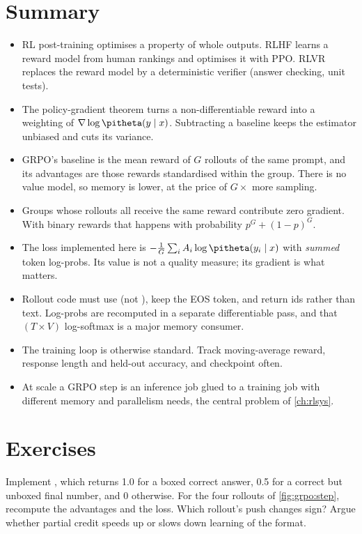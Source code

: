 \section{Summary}\label{sec:grpo:summary}
\begin{itemize}
\item RL post-training optimises a property of whole outputs. RLHF learns a reward model
from human rankings and optimises it with PPO. RLVR replaces the reward model by a
deterministic verifier (answer checking, unit tests).
\item The policy-gradient theorem turns a non-differentiable reward into a weighting of
$\nabla\log\pitheta(y\mid x)$. Subtracting a baseline keeps the estimator unbiased and cuts its
variance.
\item GRPO's baseline is the mean reward of $G$ rollouts of the same prompt, and its advantages
are those rewards standardised within the group. There is no value model, so memory is lower,
at the price of $G\times$ more sampling.
\item Groups whose rollouts all receive the same reward contribute zero gradient. With binary
rewards that happens with probability $p^G+(1-p)^G$.
\item The loss implemented here is $-\frac1G\sum_iA_i\log\pitheta(y_i\mid x)$ with
\emph{summed} token log-probs. Its value is not a quality measure; its gradient is what
matters.
\item Rollout code must use  (not ), keep the EOS token,
and return ids rather than text. Log-probs are recomputed in a separate differentiable
pass, and that $(T\times V)$ log-softmax is a major memory consumer.
\item The training loop is otherwise standard. Track moving-average reward, response
length and held-out accuracy, and checkpoint often.
\item At scale a GRPO step is an inference job glued to a training job with different memory
and parallelism needs, the central problem of \cref{ch:rlsys}.
\end{itemize}

\section{Exercises}\label{sec:grpo:exercises}

\begin{exercise}
Implement , which returns 1.0 for a boxed correct answer, 0.5 for a
correct but unboxed final number, and 0 otherwise. For the four rollouts of
\cref{fig:grpo:step}, recompute the advantages and the loss. Which rollout's push changes
sign? Argue whether partial credit speeds up or slows down learning of the format.
\end{exercise}

